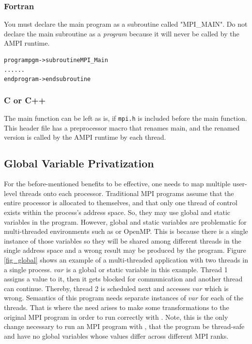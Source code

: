 \documentclass[10pt]{article}
\begin{document}
\subsubsection{Fortran}

You must declare the main program as a subroutine called "MPI\_MAIN". 
Do not declare the main subroutine as a \textit{program} because 
it will never be called by the AMPI runtime.

\begin{alltt}

program pgm -> subroutine MPI_Main
	...		    		      ...
end program -> end subroutine
\end{alltt}

\subsubsection{C or C++}

The main function can be left as is, if \texttt{mpi.h} is included before the main function. 
This header file has a preprocessor macro that renames main, and 
the renamed version is called by the AMPI runtime by each thread.


\subsection{Global Variable Privatization}

For the before-mentioned benefits to be effective, one needs to map multiple
user-level threads onto each processor. Traditional MPI programs assume that the
entire processor is allocated to themselves, and that only one thread of
control exists within the process's address space. So, they may use global and
static variables in the program. However, global and static variables are
problematic for multi-threaded environments such as \ampi{} or OpenMP.
This is because there is a single instance of those variables so they will be 
shared among different threads in the single address space and a wrong result may be produced by the program.
Figure \ref{fig_global} shows an example of a multi-threaded application with 
two threads in a single process. $var$ is a global or static variable in this 
example. Thread 1 assigns a value to it, then it gets blocked for communication 
and another thread can continue. Thereby, thread 2 is scheduled next and 
accesses $var$ which is wrong. Semantics of this program needs separate 
instances of $var$ for each of the threads. That is where the need arises
to make some transformations to the original MPI program in order to run
correctly with \ampi{}. Note, this is the only change necessary to run an MPI 
program with \ampi{}, that the program be thread-safe and have no global variables
whose values differ across different MPI ranks.
\end{document}
